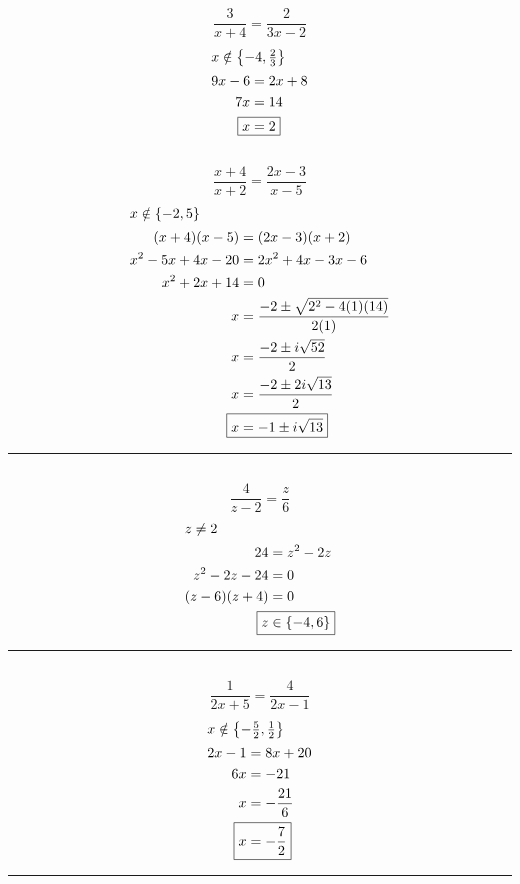 	\subsection{}
		\[\frac{3}{x + 4} = \frac{2}{3x - 2}\]
		\begin{align*}
			\intertext{$x \notin \left\{-4, \frac{2}{3}\right\}$}
			9x - 6 &= 2x + 8 \\
			7x &= 14 \\
			\Aboxed{x &= 2}
		\end{align*}

	\subsection{}
		\[\frac{x + 4}{x + 2} = \frac{2x - 3}{x - 5}\]
		\begin{align*}
			\intertext{$x \notin \{-2, 5\}$}
			(x + 4)(x - 5) &= (2x - 3)(x + 2) \\
			x^2 - 5x + 4x - 20 &= 2x^2 + 4x - 3x - 6 \\
			x^2 + 2x + 14 &= 0 \\
			x &= \frac{-2 \pm \sqrt{2^2 - 4(1)(14)}}{2(1)} \\
			x &= \frac{-2 \pm i\sqrt{52}}{2} \\
			x &= \frac{-2 \pm 2i\sqrt{13}}{2} \\
			\Aboxed{x &= -1 \pm i\sqrt{13}}
		\end{align*}
		\hrule{}

	\subsection{}
		\[\frac{4}{z - 2} = \frac{z}{6}\]
		\begin{align*}
			\intertext{$z \neq 2$}
			24 &= z^2 - 2z \\
			z^2 - 2z - 24 &= 0 \\
			(z - 6)(z + 4) &= 0 \\
			\Aboxed{z &\in \{-4, 6\}}
		\end{align*}
		\hrule{}

	\subsection{}
		\[\frac{1}{2x + 5} = \frac{4}{2x - 1}\]
		\begin{align*}
			\intertext{$x \notin \left\{-\frac{5}{2}, \frac{1}{2}\right\}$}
			2x - 1 &= 8x + 20 \\
			6x &= -21 \\
			x &= -\frac{21}{6} \\
			\Aboxed{x &= -\frac{7}{2}}
		\end{align*}
		\hrule{}

